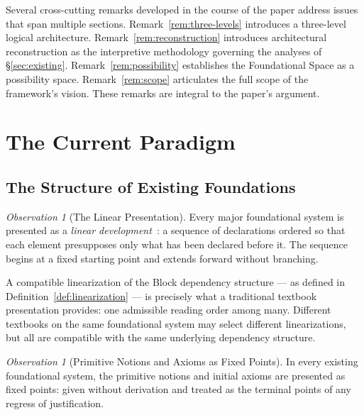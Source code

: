 \documentclass[12pt, a4paper]{article}
\theoremstyle{plain}
\theoremstyle{definition}
\theoremstyle{remark}
\newtheorem{observation}[theorem]{Observation}
\begin{document}
Several cross-cutting remarks developed in the course of the
paper address issues that span multiple sections.
Remark~\ref{rem:three-levels} introduces a three-level logical
architecture. Remark~\ref{rem:reconstruction} introduces
architectural reconstruction as the interpretive methodology
governing the analyses of \S\ref{sec:existing}.
Remark~\ref{rem:possibility} establishes the Foundational Space
as a possibility space. Remark~\ref{rem:scope} articulates the
full scope of the framework's vision. These remarks are integral
to the paper's argument.

\section{The Current Paradigm}
\label{sec:paradigm}

\subsection{The Structure of Existing Foundations}
\label{subsec:structure}

\begin{observation}[The Linear Presentation]
\label{obs:linear}
Every major foundational system is presented as a
\emph{linear development}~\cite{Enderton2001,Shoenfield1967}:
a sequence of declarations ordered so that each element
presupposes only what has been declared before it. The sequence
begins at a fixed starting point and extends forward without
branching.

A compatible linearization of the Block dependency structure ---
as defined in Definition~\ref{def:linearization} --- is precisely
what a traditional textbook presentation provides: one admissible
reading order among many. Different textbooks on the same
foundational system may select different linearizations, but all
are compatible with the same underlying dependency structure.
\end{observation}

\begin{observation}[Primitive Notions and Axioms as Fixed Points]
\label{obs:fixed}
In every existing foundational system, the primitive notions and
initial axioms are presented as fixed points: given without
derivation and treated as the terminal points of any regress of
justification.
\end{observation}
\end{document}
